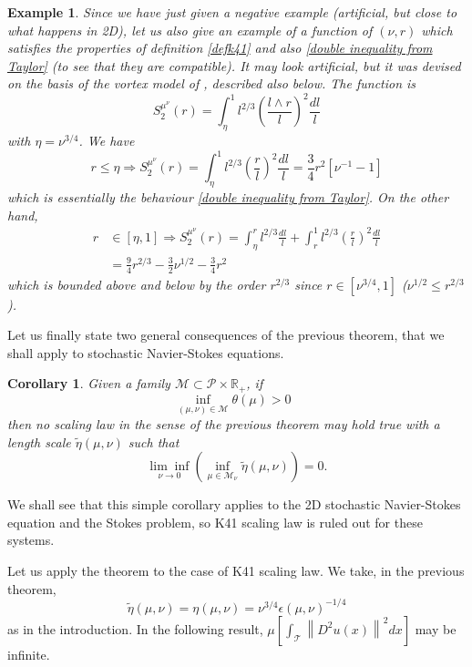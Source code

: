 \documentclass[11pt]{preprint}
\newtheorem{corollary}[theorem]{Corollary}
\newtheorem{example}[theorem]{Example}
\begin{document}
\begin{example}
Since we have just given a negative example (artificial, but close to what
happens in 2D), let us also give an example of a function of $\left(
\nu,r\right)  $ which satisfies the properties of definition \ref{defk41} and
also \ref{double inequality from Taylor} (to see that they are compatible). It
may look artificial, but it was devised on the basis of the vortex model of
\cite{FlaGub}, described also below. The function is
\[
S_{2}^{\mu^{\nu}}\left(  r\right)  =\int_{\eta}^{1}l^{2/3}\left(
\frac{l\wedge r}{l}\right)  ^{2}\frac{dl}{l}%
\]
with $\eta=\nu^{3/4}$. We have
\[
r\leq\eta\Rightarrow S_{2}^{\mu^{\nu}}\left(  r\right)  =\int_{\eta}%
^{1}l^{2/3}\left(  \frac{r}{l}\right)  ^{2}\frac{dl}{l}=\frac{3}{4}%
r^{2}\left[  \nu^{-1}-1\right]
\]
which is essentially the behaviour \ref{double inequality from Taylor}. On the
other hand,
\begin{align*}
r  & \in\left[  \eta,1\right]  \Rightarrow S_{2}^{\mu^{\nu}}\left(  r\right)
=\int_{\eta}^{r}l^{2/3}\frac{dl}{l}+\int_{r}^{1}l^{2/3}\left(  \frac{r}%
{l}\right)  ^{2}\frac{dl}{l}\\
& =\frac{9}{4}r^{2/3}-\frac{3}{2}\nu^{1/2}-\frac{3}{4}r^{2}%
\end{align*}
which is bounded above and below by the order $r^{2/3}$ since $r\in\left[
\nu^{3/4},1\right]  $ ($\nu^{1/2}\leq r^{2/3}$).
\end{example}

Let us finally state two general consequences of the previous theorem, that we
shall apply to stochastic Navier-Stokes equations.

\begin{corollary}
Given a family $\mathcal{M}\subset\mathcal{P}\times\mathbb{R}_{+}$, \bigskip
if
\[
\inf_{\left(  \mu,\nu\right)  \in\mathcal{M}}\theta\left(  \mu\right)
>0\text{ }%
\]
then no scaling law in the sense of the previous theorem may hold true with a
length scale $\widetilde{\eta}\left(  \mu,\nu\right)  $ such that
\[
\underset{\nu\rightarrow0}{\lim\inf}\left(  \inf_{\mu\in\mathcal{M}_{\nu}%
}\widetilde{\eta}\left(  \mu,\nu\right)  \right)  =0.
\]
\end{corollary}

We shall see that this simple corollary applies to the 2D stochastic
Navier-Stokes equation and the Stokes problem, so K41 scaling law is ruled out
for these systems.

Let us apply the theorem to the case of K41 scaling law. We take, in the
previous theorem,
\[
\widetilde{\eta}\left(  \mu,\nu\right)  =\eta\left(  \mu,\nu\right)
=\nu^{3/4}\epsilon\left(  \mu,\nu\right)  ^{-1/4}%
\]
as in the introduction. In the following result, $\mu\left[  \int
_{\mathcal{T}}\left\|  D^{2}u\left(  x\right)  \right\|  ^{2}dx\right]  $ may
be infinite.
\end{document}
